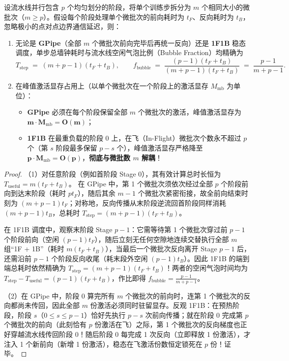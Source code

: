 \begin{thmBox}
\begin{theorem}
\label{thm:pipeline-bubble}
设流水线并行包含 $p$ 个均匀划分的阶段，将单个训练步拆分为 $m$ 个相同大小的微批次（$m \ge p$）。假设每个阶段处理单个微批次的前向耗时为 $t_F$、反向耗时为 $t_B$，忽略极小的点对点边界通信延迟，则：
\begin{enumerate}
  \item 无论是 \textbf{GPipe}（全部 $m$ 个微批次前向完毕后再统一反向）还是 \textbf{1F1B} 稳态调度，单步总墙钟耗时与流水线空闲气泡比例（Bubble Fraction）均精确为
  \begin{equation}
    T_{\mathrm{step}} \;=\; (m + p - 1)(t_F + t_B), \qquad
    f_{\mathrm{bubble}} \;=\; \frac{(p - 1)(t_F + t_B)}{(m + p - 1)(t_F + t_B)} \;=\; \frac{p - 1}{m + p - 1}.
    \label{eq:pp-bubble}
  \end{equation}
  \item 在峰值激活显存占用上（以单个微批次在一个阶段上的激活显存 $M_{\mathrm{mb}}$ 为单位）：
  \begin{itemize}
    \item \textbf{GPipe} 必须在每个阶段保留全部 $m$ 个微批次的激活，峰值激活显存为 $\mathbf{m \cdot M_{\mathrm{mb}} = O(m)}$；
    \item \textbf{1F1B} 在最重负载的阶段 0 上，在飞（In-Flight）微批次个数永不超过 $p$ 个（第 $s$ 阶段最多保留 $p - s$ 个），峰值激活显存严格降至 $\mathbf{p \cdot M_{\mathrm{mb}} = O(p)}$，\textbf{彻底与微批数 $m$ 解耦}！
  \end{itemize}
\end{enumerate}
\end{theorem}
\end{thmBox}

\begin{proof}
（1）对任意阶段（例如首阶段 Stage 0），其有效计算总时长恒为 $T_{\mathrm{useful}} = m(t_F + t_B)$。
在 GPipe 中，第 1 个微批次须依次经过全部 $p$ 个阶段前向到达末阶段（耗时 $p t_F$），随后其余 $m-1$ 个微批次紧密衔接，故全前向结束时刻为 $(m + p - 1) t_F$；对称地，反向传播从末阶段逆流回首阶段同样消耗 $(m + p - 1) t_B$，总耗时 $T_{\mathrm{step}} = (m + p - 1)(t_F + t_B)$。

在 1F1B 调度中，观察末阶段 Stage $p-1$：它需等待第 1 个微批次穿过前 $p-1$ 个阶段前向（空闲 $(p-1)t_F$），随后立刻无任何空隙地连续交替执行全部 $m$ 组“1F + 1B”（耗时 $m(t_F + t_B)$），当最后一个微批次反向离开 Stage $p-1$ 后，还需沿前 $p-1$ 个阶段反向收尾（耗末段外空闲 $(p-1)t_B$）。因此 1F1B 的端到端总耗时依然精确为 $T_{\mathrm{step}} = (m + p - 1)(t_F + t_B)$！两者的空闲气泡时间均为 $T_{\mathrm{step}} - T_{\mathrm{useful}} = (p-1)(t_F + t_B)$，作比即得 $f_{\mathrm{bubble}} = \frac{p-1}{m+p-1}$。

（2）在 GPipe 中，阶段 0 算完所有 $m$ 个微批次的前向时，连第 1 个微批次的反向都尚未传回，因此全部 $m$ 份激活必须同时驻留显存。反观 1F1B：在预热阶段，阶段 $s$（$0 \le s \le p-1$）恰好先执行 $p - s$ 次前向传播；就在阶段 0 完成第 $p$ 个微批次的前向（此刻恰有 $p$ 份激活在飞）之际，第 1 个微批次的反向梯度也正好穿越流水线传回阶段 0！随后阶段 0 每完成 1 次反向（立即释放 1 份激活），才注入 1 个新前向（新增 1 份激活），稳态在飞激活份数恒定锁死在 $p$ 份！证毕。
\end{proof}

